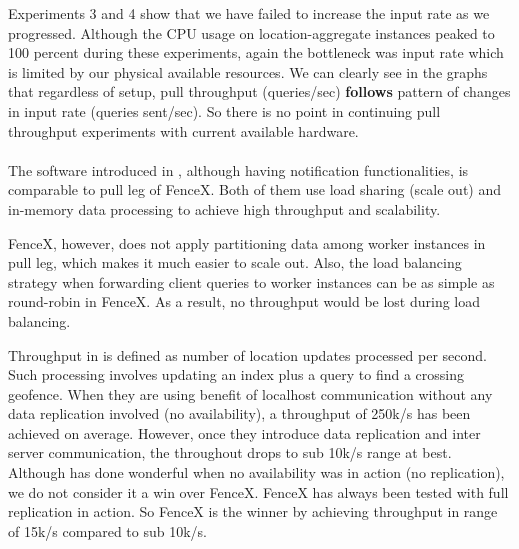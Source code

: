 \documentclass[a4]{report}
\begin{document}
    Experiments 3 and 4 show that we have failed to increase the input rate as we progressed.
    Although the CPU usage on location-aggregate instances peaked to 100 percent during these experiments,
    again the bottleneck was input rate which is limited by our physical available resources.
    We can clearly see in the graphs that regardless of setup, pull throughput (queries/sec) \textbf{follows} pattern
    of changes in input rate (queries sent/sec).
    So there is no point in continuing pull throughput experiments with current available hardware.

    \paragraph{}
    The software introduced in \cite{Cirillo-Jacobs-Martin-Szczytowski-2014}, although having notification
    functionalities, is comparable to pull leg of FenceX.
    Both of them use load sharing (scale out) and in-memory data processing to achieve high throughput and
    scalability.

    FenceX, however, does not apply partitioning data among worker instances in pull leg, which makes it much easier to
    scale out.
    Also, the load balancing strategy when forwarding client queries to worker instances can be as simple as
    round-robin in FenceX.
    As a result, no throughput would be lost during load balancing.

    Throughput in \cite{Cirillo-Jacobs-Martin-Szczytowski-2014} is defined as number of location updates processed per second.
    Such processing involves updating an index plus a query to find a crossing geofence.
    When they are using benefit of localhost communication without any data replication involved (no availability), a
    throughput of 250k/s has been achieved on average.
    However, once they introduce data replication and inter server communication, the throughout drops to sub 10k/s
    range at best.
    Although \cite{Cirillo-Jacobs-Martin-Szczytowski-2014} has done wonderful when no availability was in action (no
    replication), we do not consider it a win over FenceX.
    FenceX has always been tested with full replication in action.
    So FenceX is the winner by achieving throughput in range of 15k/s compared to sub 10k/s.
\end{document}
